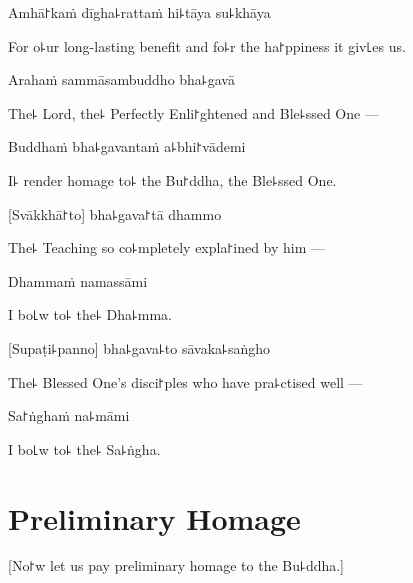 Amhā꜓kaṁ dīgha꜕rattaṁ hi꜕tāya su꜕khāya

\begin{english}
For o꜕ur long-lasting benefit and fo꜕r the ha꜓ppiness it giv꜖es us.
\end{english}

\clearpage

Arahaṁ sammāsambuddho bha꜕gavā

\begin{english}
The꜕ Lord, the꜕ Perfectly Enli꜓ghtened and Ble꜕ssed One ---
\end{english}

Buddhaṁ bha꜕gavantaṁ a꜕bhi꜓vādemi

\begin{english}
  I꜕ render homage to꜕ the Bu꜓ddha, the Ble꜕ssed One.
\end{english}

[Svākkhā꜓to] bha꜕gava꜓tā dhammo

\begin{english}
  The꜕ Teaching so co꜕mpletely expla꜓ined by him ---
\end{english}

Dhammaṁ namassāmi

\begin{english}
  I bo꜖w to꜕ the꜕ Dha꜕mma.
\end{english}

[Supaṭi꜕panno] bha꜕gava꜕to sāvaka꜕saṅgho

\begin{english}
The꜕ Blessed One's disci꜓ples who have pra꜕ctised well ---
\end{english}

Sa꜓ṅghaṁ na꜕māmi

\begin{english}
  I bo꜖w to꜕ the꜕ Sa꜕ṅgha.
\end{english}

\chapter{Preliminary Homage}

\begin{leader}
\end{leader}

\begin{english}
  [No꜓w let us pay preliminary homage to the Bu꜕ddha.]
\end{english}

